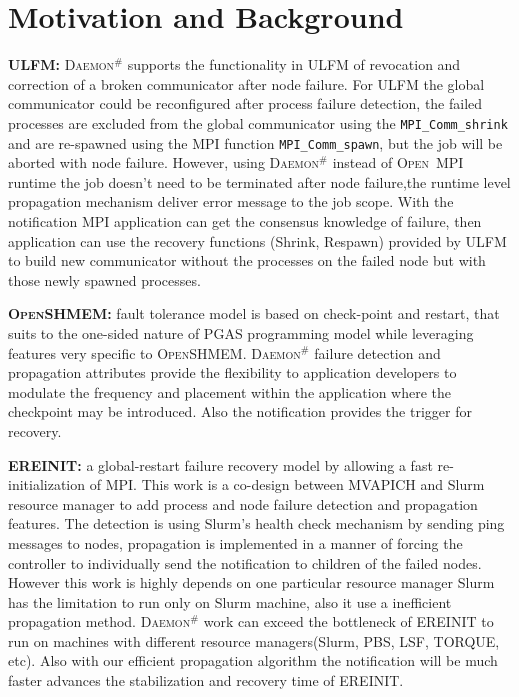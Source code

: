 \documentclass[sigconf]{acmart}
\newcommand{\mpifunc}[1]{\lstinline"MPI_#1"\xspace}
\newcommand{\ompi}[0]{\textsc{Open~MPI}\xspace}
\newcommand{\ulfm}[0]{\textsc{ULFM}\xspace}
\newcommand{\mpi}[0]{\textsc{MPI}\xspace}
\newcommand{\oshmem}[0]{\textsc{OpenSHMEM}\xspace}
\newcommand{\ourwork}[0]{\textsc{Daemon}\ensuremath{^\#}\xspace}
\begin{document}
\section{Motivation and Background}\label{sec:motivation}

\textbf{\ulfm:} \ourwork supports the functionality in \ulfm of revocation and correction of a broken communicator after node failure. For \ulfm the global communicator could be reconfigured after process failure detection, the failed processes are excluded from the global communicator using the \mpifunc{Comm_shrink} and are re-spawned using the \mpi function \mpifunc{Comm_spawn}, but the job will be aborted with node failure. However, using \ourwork instead of \ompi runtime the job doesn't need to be terminated after node failure,the runtime level propagation mechanism deliver error message to the job scope. With the notification \mpi application can get the consensus knowledge of failure, then application can use the recovery functions (Shrink, Respawn) provided by \ulfm to build new communicator without the processes on the failed node but with those newly spawned processes. 

\textbf{\oshmem:} fault tolerance model is based on check-point and restart, that suits to the one-sided nature of PGAS programming model while leveraging features very specific to \oshmem. \ourwork failure detection and propagation attributes provide the flexibility to application developers to modulate the frequency and placement within the application where the checkpoint may be introduced. Also the notification provides the trigger for recovery. 

\textbf{EREINIT:} a global-restart failure recovery model by allowing a fast re-initialization of \mpi. This work is a co-design between MVAPICH and Slurm resource manager to add process and node failure detection and propagation features. The detection is using Slurm's health check mechanism by sending ping messages to nodes, propagation is implemented in a manner of forcing the controller to individually send the notification to children of the failed nodes. However this work is highly depends on one particular resource manager Slurm has the limitation to run only on Slurm machine, also it use a inefficient propagation method. \ourwork work can exceed the bottleneck of EREINIT to run on machines with different resource managers(Slurm, PBS, LSF, TORQUE, etc). Also with our efficient propagation algorithm the notification will be much faster advances the stabilization and recovery time of EREINIT.
\end{document}

